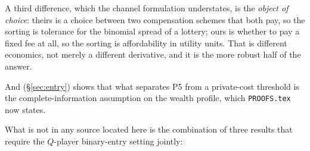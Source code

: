 \documentclass[11pt,a4paper]{article}
\begin{document}
A third difference, which the channel formulation understates, is the
\emph{object of choice}: theirs is a choice between two compensation schemes
that both pay, so the sorting is tolerance for the binomial spread of a
lottery; ours is whether to pay a fixed fee at all, so the sorting is
affordability in utility units. That is different economics, not merely a
different derivative, and it is the more robust half of the answer.

And \citet{MorenoWooders2011}
(\S\ref{sec:entry}) shows that what separates P5 from a private-cost threshold
is the complete-information assumption on the wealth profile, which
\texttt{PROOFS.tex} now states.

What is not in any source located here is the combination of three results that
require the $Q$-player binary-entry setting jointly:
\end{document}
